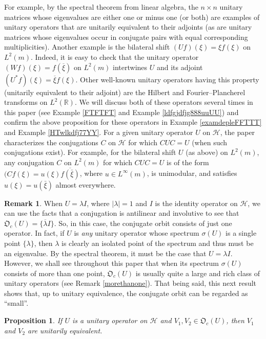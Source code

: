 \documentclass{dis}
\theoremstyle{plain}
\newtheorem{Proposition}[equation]{Proposition}
\theoremstyle{definition}
\newtheorem{Remark}[equation]{Remark}
\def\R{\mathbb{R}}
\newcommand{\0}{{\color{lightgray}0}}
\begin{document}
For example, by the spectral theorem from linear algebra, the $n \times n$ unitary matrices whose eigenvalues are either one or minus one (or both) are examples of unitary operators that are unitarily equivalent to their adjoints (as are unitary matrices whose eigenvalues occur in conjugate pairs with equal corresponding multiplicities). Another example is the bilateral shift 
$(U f)(\xi) = \xi f(\xi)$ on $L^2(m)$. Indeed, it is easy to check that the unitary operator $(W f)(\xi) = f(\overline{\xi})$ on $L^2(m)$ intertwines $U$ and its adjoint  $(U^{*} f)(\xi) = \overline{\xi} f(\xi)$. Other well-known unitary operators having this property (unitarily equivalent to their adjoint) are the Hilbert and Fourier--Plancherel transforms on $L^2(\R)$. We will discuss both of these operators several times in this paper (see Example \ref{FTFTFT} and Example \ref{ldfgjdfjg888uuUU})  and confirm the above proposition for these operators in Example \ref{examdepleFFTTT} and Example \ref{HTwlkdfj77YY}. For a given unitary operator $U$ on $\mathcal{H}$, the paper \cite{MR4745001} characterizes the  conjugations $C$ on $\mathcal{H}$  for which $C U C = U$ (when such conjugations exist). For example, for the bilateral shift $U$ (as above) on $L^2(m)$, any conjugation $C$ on $L^2(m)$ for which $CUC = U$ is of the form $(C f(\xi) = u(\xi) \overline{f(\bar \xi)}$, where $u \in L^{\infty}(m)$, is unimodular, and satisfies $u(\xi) = u(\bar \xi)$ almost everywhere.  


\begin{Remark}\label{singlepoint}
When $U = \lambda I$, where $|\lambda| = 1$ and $I$ is the identity operator on $\mathcal{H}$,  we can use the facts that a conjugation is antilinear and involutive to see that $\mathfrak{O}_c(U) = \{\overline{\lambda} I\}$. So, in this case, the conjugate orbit consists of just one operator. In fact, if $U$ is {\em any} unitary operator whose spectrum $\sigma(U)$ is a single point $\{\lambda\}$, then $\lambda$ is clearly an isolated point of the spectrum and thus must be an eigenvalue. By the spectral theorem, it must be the case that $U = \lambda I$. 
However, we shall see throughout this paper that when its spectrum $\sigma(U)$ consists of more than one point, $\mathfrak{O}_c(U)$ is usually quite a large and rich class of unitary operators  (see Remark \ref{morethanone}). That being said, this next result shows  that, up to unitary equivalence, the conjugate orbit can be regarded as  ``small''.
\end{Remark}

\begin{Proposition}\label{uuueeeqq}
If $U$ is a unitary operator on $\mathcal{H}$ and  $V_1, V_2 \in \mathfrak{O}_c(U)$, then $V_1$ and $V_2$ are unitarily equivalent.
\end{Proposition}
\end{document}
